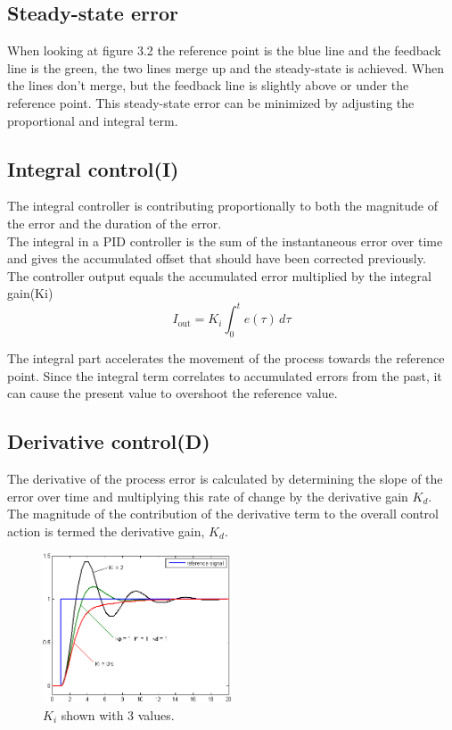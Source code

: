 \subsection {Steady-state error}

When looking at figure 3.2 the reference point is the blue line and the feedback line is the green, the two lines merge up and the steady-state is achieved. When the lines don't merge, but the feedback line is slightly above or under the reference point. This steady-state error can be minimized by adjusting the proportional and integral term. 

\subsection {Integral control(I)}

The integral controller is contributing proportionally to both the magnitude of the error and the duration of the error. \\
The integral in a PID controller is the sum of the instantaneous error over time and gives the accumulated offset that should have been corrected previously. \\ 

The controller output equals the accumulated error multiplied by the integral gain(Ki)\\
$$I_{\mathrm{out}}=K_{i}\int_{0}^{t}{e(\tau)}\,{d\tau}$$ 

The integral part accelerates the movement of the process towards the reference point.
Since the integral term correlates to accumulated errors from the past, it can cause the present value to overshoot the reference value.

\subsection {Derivative control(D)} 

The derivative of the process error is calculated by determining the slope of the error over time and multiplying this rate of change by the derivative gain $K_d$. The magnitude of the contribution of the derivative term to the overall control action is termed the derivative gain, $K_d$.
\begin{figure}[h!]
  \centering
  \includegraphics[width=0.5\textwidth]{figures/Change_with_Ki.png}
  
  \caption{$K_i$ shown with 3 values.} 
  \label{PID controller}
\end{figure}

